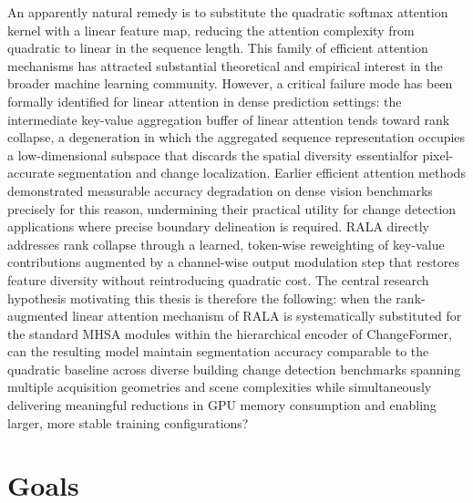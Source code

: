 An apparently natural remedy is to substitute the quadratic softmax attention kernel with a linear feature map, reducing the attention complexity from quadratic to linear in the sequence length. This family of efficient attention mechanisms has attracted substantial theoretical and empirical interest in the broader machine learning community. However, a critical failure mode has been formally identified for linear attention in dense prediction settings: the intermediate key-value aggregation buffer of linear attention tends toward rank collapse, a degeneration in which the aggregated sequence representation occupies a low-dimensional subspace that discards the spatial diversity essentialfor pixel-accurate segmentation and change localization. Earlier efficient attention methods demonstrated measurable accuracy degradation on dense vision benchmarks precisely for this reason, undermining their practical utility for change detection applications where precise boundary delineation is required. \ac{RALA} \cite{Fan2025RALA} directly addresses rank collapse through a learned, token-wise reweighting of key-value contributions augmented by a channel-wise output modulation step that restores feature diversity without reintroducing quadratic cost. The central research hypothesis motivating this thesis is therefore the following: when the rank-augmented linear attention mechanism of \ac{RALA} is systematically substituted for the standard \ac{MHSA} modules within the hierarchical encoder of ChangeFormer, can the resulting model maintain segmentation accuracy comparable to the quadratic baseline across diverse building change detection benchmarks spanning multiple acquisition geometries and scene complexities while simultaneously delivering meaningful reductions in \ac{GPU} memory consumption and enabling larger, more stable training configurations?


\section{Goals}

